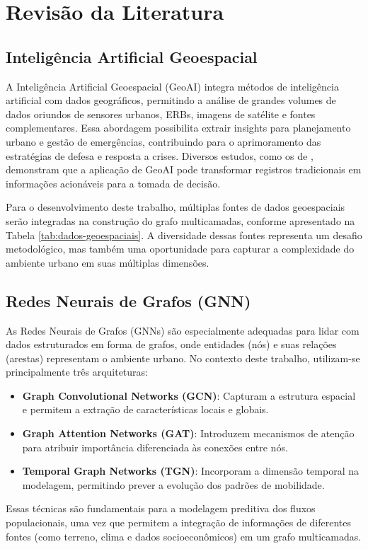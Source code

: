 \chapter{Revisão da Literatura}
\label{chap:revisao}

\section{Inteligência Artificial Geoespacial}
A Inteligência Artificial Geoespacial (\gls{GeoAI}) integra métodos de inteligência artificial com dados geográficos, permitindo a análise de grandes volumes de dados oriundos de sensores urbanos, \gls{ERB}s, imagens de satélite e fontes complementares. Essa abordagem possibilita extrair insights para planejamento urbano e gestão de emergências, contribuindo para o aprimoramento das estratégias de defesa e resposta a crises. Diversos estudos, como os de \cite{GAO2021}, demonstram que a aplicação de \gls{GeoAI} pode transformar registros tradicionais em informações acionáveis para a tomada de decisão.

Para o desenvolvimento deste trabalho, múltiplas fontes de dados geoespaciais serão integradas na construção do grafo multicamadas, conforme apresentado na Tabela \ref{tab:dados-geoespaciais}. A diversidade dessas fontes representa um desafio metodológico, mas também uma oportunidade para capturar a complexidade do ambiente urbano em suas múltiplas dimensões.

\section{Redes Neurais de Grafos (GNN)}
As Redes Neurais de Grafos (\gls{GNN}s) são especialmente adequadas para lidar com dados estruturados em forma de grafos, onde entidades (nós) e suas relações (arestas) representam o ambiente urbano. No contexto deste trabalho, utilizam-se principalmente três arquiteturas:
\begin{itemize}[noitemsep]
    \item \textbf{Graph Convolutional Networks (GCN)}: Capturam a estrutura espacial e permitem a extração de características locais e globais.
    \item \textbf{Graph Attention Networks (GAT)}: Introduzem mecanismos de atenção para atribuir importância diferenciada às conexões entre nós.
    \item \textbf{Temporal Graph Networks (TGN)}: Incorporam a dimensão temporal na modelagem, permitindo prever a evolução dos padrões de mobilidade.
\end{itemize}
Essas técnicas são fundamentais para a modelagem preditiva dos fluxos populacionais, uma vez que permitem a integração de informações de diferentes fontes (como terreno, clima e dados socioeconômicos) em um grafo multicamadas.


